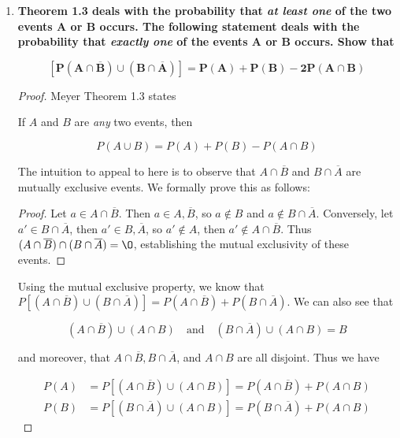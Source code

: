 \documentclass[10pt, oneside]{article}
\begin{document}
\begin{enumerate}[label=1.\arabic*]
\newpage
\item  \begin{tcolorbox}[
  colback=Cerulean!5!white,
  colframe=Cerulean!75!black]
\textbf{Theorem 1.3 deals with the probability that \textit{at least one} of the two events $\bm{A}$ or $\bm{B}$ occurs. The following statement deals with the probability that \textit{exactly one} of the events $\bm{A}$ or $\bm{B}$ occurs. Show that}

\[ \bm{[P(A \cap \overline{B}) \cup (B \cap \overline{A})] = P(A) + P(B) - 2P(A \cap B)} \]
\end{tcolorbox}

\begin{proof}

Meyer Theorem 1.3 states

\begin{thm}
If $A$ and $B$ are \textit{any} two events, then

\[ P(A \cup B) = P(A) + P(B) - P(A \cap B) \]
\end{thm}

The intuition to appeal to here is to observe that $A \cap \overline{B}$ and $B \cap \overline{A}$ are mutually exclusive events. We formally prove this as follows:

\begin{proof}
Let $a \in A \cap \overline{B}$. Then $a \in A, \overline{B}$, so $a \notin B$ and $a \notin B \cap \overline{A}$. Conversely, let $a' \in B \cap \overline{A}$, then $a' \in B, \overline{A}$, so $a' \notin A$, then $a' \notin A \cap \overline{B}$. Thus $(A \cap \overline{B}) \cap (B \cap \overline{A}) = \O$, establishing the mutual exclusivity of these events.
\end{proof}

Using the mutual exclusive property, we know that $P[(A \cap \overline{B}) \cup (B \cap \overline{A})] = P(A \cap \overline{B}) + P(B \cap \overline{A})$. We can also see that

\[ (A \cap \overline{B}) \cup (A \cap B) \quad \text{and} \quad (B \cap \overline{A}) \cup (A \cap B) = B \]

and moreover, that $A \cap \overline{B}, B \cap \overline{A}$, and $A \cap B$ are all disjoint. Thus we have

\begin{align*}
P(A) &= P[(A \cap \overline{B}) \cup (A \cap B)] = P(A \cap \overline{B}) + P(A \cap B) \\
P(B) &= P[(B \cap \overline{A}) \cup (A \cap B)] = P(B \cap \overline{A}) + P(A \cap B)
\end{align*}


\end{proof}
\end{enumerate}
\end{document}
